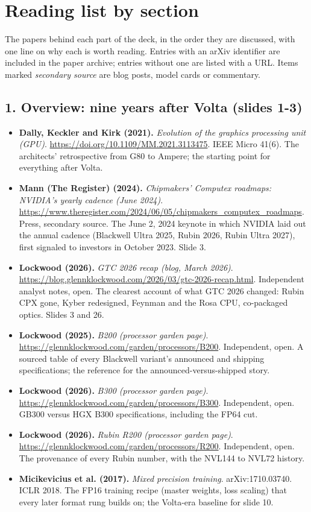 \section*{Reading list by section}
The papers behind each part of the deck, in the order they are discussed, with one line on why each is worth reading. Entries with an arXiv identifier are included in the paper archive; entries without one are listed with a URL. Items marked \emph{secondary source} are blog posts, model cards or commentary.

\subsection*{1. Overview: nine years after Volta (slides 1-3)}
\begin{itemize}[leftmargin=1.2em,itemsep=3pt]\sloppy
\item \textbf{Dally, Keckler and Kirk (2021).} \textit{Evolution of the graphics processing unit (GPU)}. \url{https://doi.org/10.1109/MM.2021.3113475}. IEEE Micro 41(6). The architects' retrospective from G80 to Ampere; the starting point for everything after Volta.
\item \textbf{Mann (The Register) (2024).} \textit{Chipmakers' Computex roadmaps: NVIDIA's yearly cadence (June 2024)}. \url{https://www.theregister.com/2024/06/05/chipmakers_computex_roadmaps}. Press, secondary source. The June 2, 2024 keynote in which NVIDIA laid out the annual cadence (Blackwell Ultra 2025, Rubin 2026, Rubin Ultra 2027), first signaled to investors in October 2023. Slide 3.
\item \textbf{Lockwood (2026).} \textit{GTC 2026 recap (blog, March 2026)}. \url{https://blog.glennklockwood.com/2026/03/gtc-2026-recap.html}. Independent analyst notes, open. The clearest account of what GTC 2026 changed: Rubin CPX gone, Kyber redesigned, Feynman and the Rosa CPU, co-packaged optics. Slides 3 and 26.
\item \textbf{Lockwood (2025).} \textit{B200 (processor garden page)}. \url{https://glennklockwood.com/garden/processors/B200}. Independent, open. A sourced table of every Blackwell variant's announced and shipping specifications; the reference for the announced-versus-shipped story.
\item \textbf{Lockwood (2026).} \textit{B300 (processor garden page)}. \url{https://glennklockwood.com/garden/processors/B300}. Independent, open. GB300 versus HGX B300 specifications, including the FP64 cut.
\item \textbf{Lockwood (2026).} \textit{Rubin R200 (processor garden page)}. \url{https://glennklockwood.com/garden/processors/R200}. Independent, open. The provenance of every Rubin number, with the NVL144 to NVL72 history.
\item \textbf{Micikevicius et al. (2017).} \textit{Mixed precision training}. arXiv:1710.03740. ICLR 2018. The FP16 training recipe (master weights, loss scaling) that every later format rung builds on; the Volta-era baseline for slide 10.
\end{itemize}
